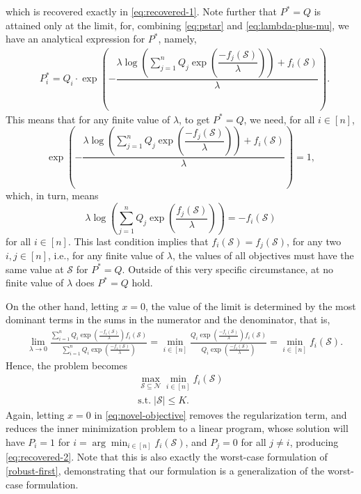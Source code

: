 \documentclass[letter,11pt]{article}
\newcommand{\argmin}{\arg\!\min}
\def\lp{\left(}
\def\rp{\right)}
\def\sS{\mathcal{S}}
\def\sN{\mathcal{N}}
\begin{document}
which is recovered exactly in \eqref{eq:recovered-1}. Note further that $P^\ast=Q$ is attained only at the limit, for, combining \eqref{eq:pstar} and \eqref{eq:lambda-plus-mu}, we have an analytical expression for $P^\ast$, namely,
\begin{equation}\label{eq:optmalPi}
\begin{split}
&P_i^\ast = Q_i \cdot \exp\left(-\dfrac{\lambda\log\left(\sum_{j=1}^n Q_j \exp\left(\dfrac{-f_j(\sS)}{\lambda}\right)\right)+f_i(\sS)}{\lambda}\right).
\end{split}
\end{equation}
This means that for any finite value of $\lambda$, to get $P^\ast=Q$, we need, for all $i \in [n]$,
\begin{equation}
\exp\left(-\dfrac{\lambda\log\left(\sum_{j=1}^n Q_j \exp\left(\dfrac{-f_j(\sS)}{\lambda}\right)\right)+f_i(\sS)}{\lambda}\right)= 1,
\end{equation}
which, in turn, means
\begin{equation}
\lambda\log\left(\sum_{j=1}^nQ_j\exp\left(\dfrac{f_j(\sS)}{\lambda}\right)\right)=-f_i(\sS)
\end{equation}
for all $i \in [n]$. This last condition implies that $f_i(\sS) = f_j(\sS)$, for any two $i, j \in [n]$, i.e., for any finite value of $\lambda$,  the values of all objectives must have the same value at $\sS$ for $P^\ast = Q$. Outside of this very specific circumstance, at no finite value of $\lambda$ does $P^\ast=Q$ hold.

On the other hand, letting $x=0$, the value of the limit is determined by the most dominant terms in the sums in the numerator and the denominator, that is,
\begin{equation}
\begin{split}
&\lim_{\lambda\to 0} \frac{\sum_{i=1}^nQ_i\exp{\lp\frac{-f_i(\sS)}{\lambda}\rp f_i(\sS)}}{\sum_{i=1}^nQ_i\exp{\lp\frac{-f_i(\sS)}{\lambda}\rp}} = \min_{i\in[n]} \frac{Q_i\exp{\lp\frac{-f_i(\sS)}{\lambda}\rp f_i(\sS)}}{Q_i\exp{\lp\frac{-f_i(\sS)}{\lambda}\rp}} = \min_{i\in[n]} f_i(\sS).
\end{split}
\end{equation}
Hence, the problem becomes
\begin{equation}\label{eq:recovered-2}
\begin{gathered}
\max_{\sS\subseteq \sN} \min_{i\in[n]} f_i(\sS)\\
\text{s.t.}\;\lvert \sS\rvert \leq K.
\end{gathered}
\end{equation}
Again, letting $x=0$ in \eqref{eq:novel-objective} removes the regularization term, and reduces the inner minimization problem to a linear program, whose solution will have $P_i = 1$ for $i = \argmin_{i\in[n]} f_i(\sS)$, and $P_j = 0$ for all $j\neq i$, producing \eqref{eq:recovered-2}. Note that this is also exactly the worst-case formulation of \eqref{robust-first}, demonstrating that our formulation is a generalization of the worst-case formulation.
\end{document}
